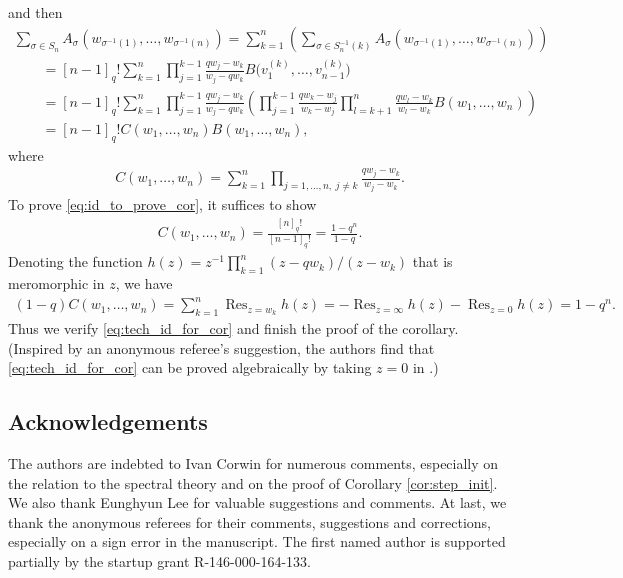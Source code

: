 \documentclass[pdftex]{sigma}
\numberwithin{equation}{section}
\DeclareMathOperator*{\Res}{Res}
\begin{document}
and then
\begin{gather*}
  \sum_{\sigma \in S_n} A_{\sigma}(w_{\sigma^{-1}(1)}, \dotsc, w_{\sigma^{-1}(n)})
 = \sum^n_{k = 1} \left( \sum_{\sigma \in S^{-1}_n(k)} A_{\sigma}(w_{\sigma^{-1}(1)}, \dotsc, w_{\sigma^{-1}(n)}) \right) \\
\qquad{} =    [n - 1]_q! \sum^n_{k = 1} \prod^{k - 1}_{j = 1} \frac{q w_j - w_k}{w_j - q w_k} B\big(v^{(k)}_1, \dotsc, v^{(k)}_{n - 1}\big) \\
 \qquad{} =   [n - 1]_q! \sum^n_{k = 1} \prod^{k - 1}_{j = 1} \frac{q w_j - w_k}{w_j - q w_k} \left( \prod^{k - 1}_{j = 1} \frac{q w_k - w_j}{w_k - w_j} \prod^n_{l = k + 1} \frac{q w_l - w_k}{w_l - w_k} B(w_1, \dotsc, w_n) \right) \\
 \qquad{} =   [n - 1]_q! C(w_1, \dotsc, w_n) B(w_1, \dotsc, w_n),
\end{gather*}
where
\begin{gather*} %
 C(w_1, \dotsc, w_n) = \sum^n_{k = 1} \prod_{j = 1, \dotsc, n, \ j \neq k} \frac{q w_j - w_k}{w_j - w_k}.
\end{gather*}
To prove \eqref{eq:id_to_prove_cor}, it suf\/f\/ices to show
\begin{gather} \label{eq:tech_id_for_cor}
 C(w_1, \dotsc, w_n) = \frac{[n]_q!}{[n - 1]_q!} = \frac{1 - q^n}{1 - q}.
\end{gather}
Denoting the function $h(z) = z^{-1} \prod\limits^n_{k = 1} (z - q w_k)/(z - w_k)$ that is meromorphic in $z$, we have
\begin{gather*}
 (1 - q) C(w_1, \dotsc, w_n) = \sum^n_{k = 1} \Res_{z = w_k} h(z) = -\Res_{z = \infty} h(z) - \Res_{z = 0} h(z) = 1 - q^n.
\end{gather*}
Thus we verify \eqref{eq:tech_id_for_cor} and f\/inish the proof of the corollary. (Inspired by an anonymous referee's suggestion, the authors f\/ind that \eqref{eq:tech_id_for_cor} can be proved algebraically by taking $z = 0$ in \cite[the f\/irst formula on p.~210]{Macdonald95}.)

\subsection*{Acknowledgements}

The authors are indebted to Ivan Corwin for numerous comments, especially on the relation to the spectral theory and on the proof of Corollary \ref{cor:step_init}. We also thank Eunghyun Lee for valuable suggestions and comments. At last, we thank the anonymous referees for their comments, suggestions and corrections, especially on a sign error in the manuscript. The f\/irst named author is supported partially by the startup grant R-146-000-164-133.
\end{document}
